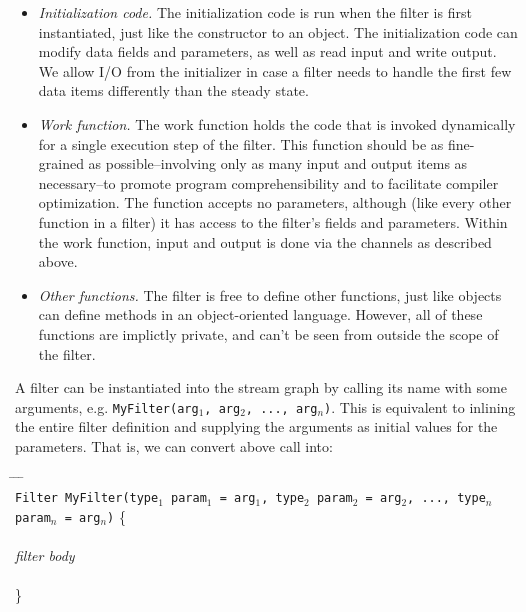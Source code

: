 \documentclass[draft]{article}
\begin{document}
\begin{itemize}
\item {\it Initialization code.}  The initialization code is run when
the filter is first instantiated, just like the constructor to an
object.  The initialization code can modify data fields and
parameters, as well as read input and write output.  We allow I/O from
the initializer in case a filter needs to handle the first few data
items differently than the steady state.

\item {\it Work function.}  The work function holds the code that is
invoked dynamically for a single execution step of the filter.  This
function should be as fine-grained as possible--involving only as many
input and output items as necessary--to promote program
comprehensibility and to facilitate compiler optimization.  The
function accepts no parameters, although (like every other function in
a filter) it has access to the filter's fields and parameters.  Within
the work function, input and output is done via the channels as
described above.

\item {\it Other functions.}  The filter is free to define other
functions, just like objects can define methods in an object-oriented
language.  However, all of these functions are implictly private, and
can't be seen from outside the scope of the filter.

\end{itemize}

\medskip
{}
\medskip

A filter can be instantiated into the stream graph by calling its name
with some arguments, e.g. {\tt MyFilter(arg$_1$, arg$_2$, ...,
arg$_n$)}.  This is equivalent to inlining the entire filter
definition and supplying the arguments as initial values for the
parameters.  That is, we can convert above call into:

\begin{tabbing}
\hspace{0.2in} \= \hspace{0.2in} \= \hspace{0.2in} \= \hspace{0.2in} \= \\

{\tt Filter MyFilter(type$_1$ param$_1$ = arg$_1$, type$_2$ param$_2$
= arg$_2$, ..., type$_n$ param$_n$ = arg$_n$)} \{ \\ \\

\> {\it filter body} \\ \\
\}
\end{tabbing}
\end{document}
